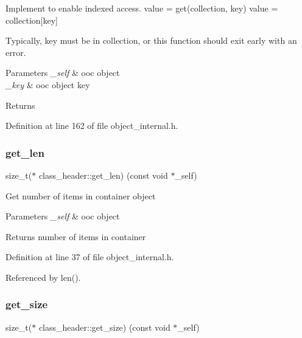 Implement to enable indexed access. value = get(collection, key) value = collection\mbox{[}key\mbox{]}

Typically, key must be in collection, or this function should exit early with an error. 
\begin{DoxyParams}{Parameters}
{\em \+\_\+self} & ooc object \\
\hline
{\em \+\_\+key} & ooc object key \\
\hline
\end{DoxyParams}
\begin{DoxyReturn}{Returns}

\end{DoxyReturn}


Definition at line 162 of file object\+\_\+internal.\+h.

\mbox{\label{structclass__header_a1b7cb949741b9a64fd3569af94f30cba}} 
\subsubsection{\texorpdfstring{get\+\_\+len}{get\_len}}
{\footnotesize\ttfamily size\+\_\+t($\ast$ class\+\_\+header\+::get\+\_\+len) (const void $\ast$\+\_\+self)}

Get number of items in container object 
\begin{DoxyParams}{Parameters}
{\em \+\_\+self} & ooc object \\
\hline
\end{DoxyParams}
\begin{DoxyReturn}{Returns}
number of items in container 
\end{DoxyReturn}


Definition at line 37 of file object\+\_\+internal.\+h.



Referenced by len().

\mbox{\label{structclass__header_a5c135b5316d0d9d22dce1f32fb8befb1}} 
\subsubsection{\texorpdfstring{get\+\_\+size}{get\_size}}
{\footnotesize\ttfamily size\+\_\+t($\ast$ class\+\_\+header\+::get\+\_\+size) (const void $\ast$\+\_\+self)}

